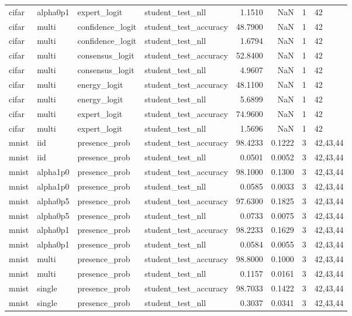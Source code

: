 \begin{tabular}{llllrrrl}
cifar & alpha0p1 & expert\_logit & student\_test\_nll & 1.1510 & NaN & 1 & 42 \\
cifar & multi & confidence\_logit & student\_test\_accuracy & 48.7900 & NaN & 1 & 42 \\
cifar & multi & confidence\_logit & student\_test\_nll & 1.6794 & NaN & 1 & 42 \\
cifar & multi & consensus\_logit & student\_test\_accuracy & 52.8400 & NaN & 1 & 42 \\
cifar & multi & consensus\_logit & student\_test\_nll & 4.9607 & NaN & 1 & 42 \\
cifar & multi & energy\_logit & student\_test\_accuracy & 48.1100 & NaN & 1 & 42 \\
cifar & multi & energy\_logit & student\_test\_nll & 5.6899 & NaN & 1 & 42 \\
cifar & multi & expert\_logit & student\_test\_accuracy & 74.9600 & NaN & 1 & 42 \\
cifar & multi & expert\_logit & student\_test\_nll & 1.5696 & NaN & 1 & 42 \\
mnist & iid & presence\_prob & student\_test\_accuracy & 98.4233 & 0.1222 & 3 & 42,43,44 \\
mnist & iid & presence\_prob & student\_test\_nll & 0.0501 & 0.0052 & 3 & 42,43,44 \\
mnist & alpha1p0 & presence\_prob & student\_test\_accuracy & 98.1000 & 0.1300 & 3 & 42,43,44 \\
mnist & alpha1p0 & presence\_prob & student\_test\_nll & 0.0585 & 0.0033 & 3 & 42,43,44 \\
mnist & alpha0p5 & presence\_prob & student\_test\_accuracy & 97.6300 & 0.1825 & 3 & 42,43,44 \\
mnist & alpha0p5 & presence\_prob & student\_test\_nll & 0.0733 & 0.0075 & 3 & 42,43,44 \\
mnist & alpha0p1 & presence\_prob & student\_test\_accuracy & 98.2233 & 0.1629 & 3 & 42,43,44 \\
mnist & alpha0p1 & presence\_prob & student\_test\_nll & 0.0584 & 0.0055 & 3 & 42,43,44 \\
mnist & multi & presence\_prob & student\_test\_accuracy & 98.8000 & 0.1000 & 3 & 42,43,44 \\
mnist & multi & presence\_prob & student\_test\_nll & 0.1157 & 0.0161 & 3 & 42,43,44 \\
mnist & single & presence\_prob & student\_test\_accuracy & 98.7033 & 0.1422 & 3 & 42,43,44 \\
mnist & single & presence\_prob & student\_test\_nll & 0.3037 & 0.0341 & 3 & 42,43,44 \\

\end{tabular}
